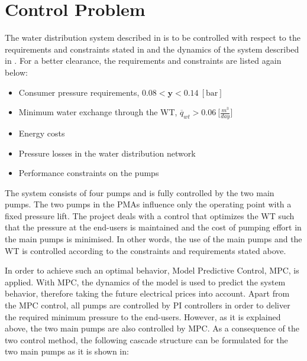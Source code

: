 \section{Control Problem}
\label{control_problem}
The water distribution system described in  is to be controlled with respect to the requirements and constraints stated in  and the dynamics of the system described in . For a better clearance, the requirements and constraints are listed again below: 
\begin{itemize}
	\item Consumer pressure requirements, $0.08 < \pmb{y} < 0.14 \:[\text{bar}]$
%
	\item Minimum water exchange through the WT, $\overline{q}_{wt} > 0.06 \: \big[\frac{m^3}{day}\big]$
%
	\item Energy costs 
%
	\item Pressure losses in the water distribution network
%
	\item Performance constraints on the pumps
\end{itemize}
The system consists of four pumps and is fully controlled by the two main pumps. The two pumps in the PMAs influence only the operating point with a fixed pressure lift. The project deals with a control that optimizes the WT such that the pressure at the end-users is maintained and the cost of pumping effort in the main pumps is minimised. In other words, the use of the main pumps and the WT is controlled according to the constraints and requirements stated above. 

In order to achieve such an optimal behavior, Model Predictive Control, MPC, is applied. With MPC, the dynamics of the model is used to predict the system behavior, therefore taking the future electrical prices into account. Apart from the MPC control, all pumps are controlled by PI controllers in order to deliver the required minimum pressure to the end-users. However, as it is explained above, the two main pumps are also controlled by MPC. As a consequence of the two control method, the following cascade structure can be formulated for the two main pumps as it is shown in: 

